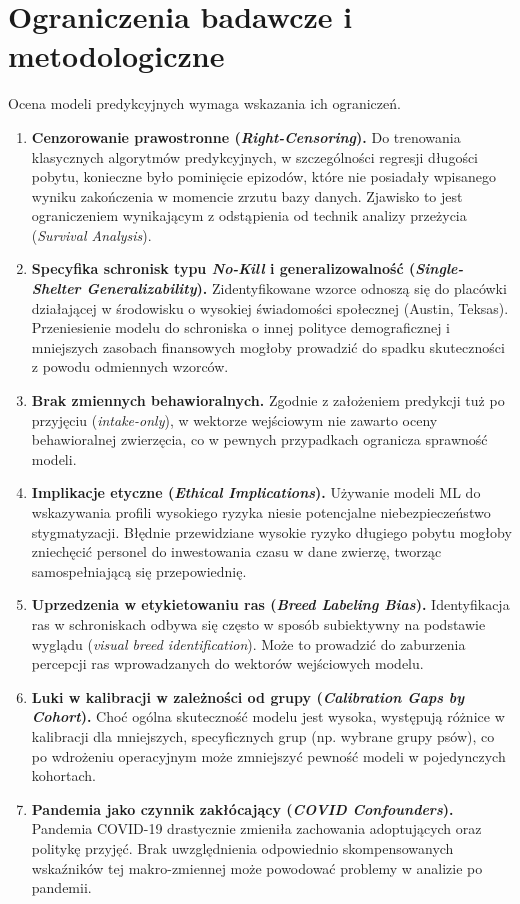 \section{Ograniczenia badawcze i metodologiczne}
\label{sec:ograniczenia-badawcze-metodologiczne}

Ocena modeli predykcyjnych wymaga wskazania ich ograniczeń.

\begin{enumerate}
    \item \textbf{Cenzorowanie prawostronne (\emph{Right-Censoring}).} Do trenowania klasycznych algorytmów predykcyjnych, w szczególności regresji długości pobytu, konieczne było pominięcie epizodów, które nie posiadały wpisanego wyniku zakończenia w momencie zrzutu bazy danych. Zjawisko to jest ograniczeniem wynikającym z odstąpienia od technik analizy przeżycia (\emph{Survival Analysis}).
    \item \textbf{Specyfika schronisk typu \emph{No-Kill} i generalizowalność (\emph{Single-Shelter Generalizability}).} Zidentyfikowane wzorce odnoszą się do placówki działającej w środowisku o wysokiej świadomości społecznej (Austin, Teksas). Przeniesienie modelu do schroniska o innej polityce demograficznej i mniejszych zasobach finansowych mogłoby prowadzić do spadku skuteczności z powodu odmiennych wzorców.
    \item \textbf{Brak zmiennych behawioralnych.} Zgodnie z założeniem predykcji tuż po przyjęciu (\emph{intake-only}), w wektorze wejściowym nie zawarto oceny behawioralnej zwierzęcia, co w pewnych przypadkach ogranicza sprawność modeli.
    \item \textbf{Implikacje etyczne (\emph{Ethical Implications}).} Używanie modeli ML do wskazywania profili wysokiego ryzyka niesie potencjalne niebezpieczeństwo stygmatyzacji. Błędnie przewidziane wysokie ryzyko długiego pobytu mogłoby zniechęcić personel do inwestowania czasu w dane zwierzę, tworząc samospełniającą się przepowiednię.
    \item \textbf{Uprzedzenia w etykietowaniu ras (\emph{Breed Labeling Bias}).} Identyfikacja ras w schroniskach odbywa się często w sposób subiektywny na podstawie wyglądu (\emph{visual breed identification}). Może to prowadzić do zaburzenia percepcji ras wprowadzanych do wektorów wejściowych modelu.
    \item \textbf{Luki w kalibracji w zależności od grupy (\emph{Calibration Gaps by Cohort}).} Choć ogólna skuteczność modelu jest wysoka, występują różnice w kalibracji dla mniejszych, specyficznych grup (np. wybrane grupy psów), co po wdrożeniu operacyjnym może zmniejszyć pewność modeli w pojedynczych kohortach.
    \item \textbf{Pandemia jako czynnik zakłócający (\emph{COVID Confounders}).} Pandemia COVID-19 drastycznie zmieniła zachowania adoptujących oraz politykę przyjęć. Brak uwzględnienia odpowiednio skompensowanych wskaźników tej makro-zmiennej może powodować problemy w analizie po pandemii.
\end{enumerate}

